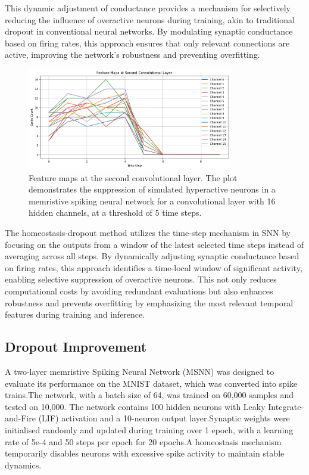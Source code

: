\noindent This dynamic adjustment of conductance provides a mechanism for selectively reducing the influence of overactive neurons during training, akin to traditional dropout in conventional neural networks. By modulating synaptic conductance based on firing rates, this approach ensures that only relevant connections are active, improving the network's robustness and preventing overfitting. \\

\begin{figure}[!t]
    \centerline{\includegraphics[width=0.8\textwidth]{Chapter7/Figs/b.png}}
    \caption[Feature maps at the second convolutional layer.]{Feature maps at the second convolutional layer. The plot demonstrates the suppression of simulated hyperactive neurons in a memristive spiking neural network for a convolutional layer with 16 hidden channels, at a threshold of 5 time steps.}
    \label{fig:7b}
\end{figure}

\noindent The homeostasis-dropout method utilizes the time-step mechanism in SNN by focusing on the outputs from a window of the latest selected time steps instead of averaging across all steps. By dynamically adjusting synaptic conductance based on firing rates, this approach identifies a time-local window of significant activity, enabling selective suppression of overactive neurons. This not only reduces computational costs by avoiding redundant evaluations but also enhances robustness and prevents overfitting by emphasizing the most relevant temporal features during training and inference.

\subsection{Dropout Improvement}


\noindent A two-layer memristive Spiking Neural Network (MSNN) was designed to evaluate its performance on the MNIST dataset, which was converted into spike trains.The network, with a batch size of 64, was trained on 60,000 samples and tested on 10,000. The network contains 100 hidden neurons with Leaky Integrate-and-Fire (LIF) activation and a 10-neuron output layer.Synaptic weights were initialised randomly and updated during training over 1 epoch, with a learning rate of 5e-4 and 50 steps per epoch for 20 epochs.A homeostasis mechanism temporarily disables neurons with excessive spike activity to maintain stable dynamics.\\ 

